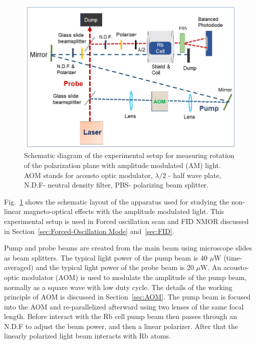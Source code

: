 \begin{figure}%
\centering
\includegraphics[width=0.95\linewidth]{figures/experimental_setup}
\caption{Schematic diagram of the experimental setup for measuring
  rotation of the polarization plane with amplitude modulated (AM)
  light. AOM stands for acousto optic modulator, $\lambda/2$ - half
  wave plate, N.D.F- neutral density filter, PBS- polarizing beam
  splitter.\label{fig:pumpprobe}}
\end{figure}

Fig.~\ref{fig:pumpprobe} shows the schematic layout of the apparatus
used for studying the non-linear magneto-optical effects with the
amplitude modulated light. This experimental setup is used in Forced
oscillation scan and FID NMOR discussed in
Section~\ref{sec:Forced-Oscillation Mode} and~\ref{sec:FID}.



Pump and probe beams are created from the main beam using microscope
slides as beam splitters. The typical light power of the pump beam is
40 $\mu$W (time-averaged) and the typical light power of the probe
beam is 20 $\mu$W.  An acousto-optic modulator (AOM) is used to
modulate the amplitude of the pump beam, normally as a square wave
with low duty cycle.  The details of the working principle of AOM is
discussed in Section~\ref{sec:AOM}.  The pump beam is focused into the
AOM and re-parallelized afterward using two lenses of the same focal
length.  Before interact with the Rb cell pump beam then passes
through an N.D.F to adjust the beam power, and then a linear
polarizer.  After that the linearly polarized light beam interacts with
Rb atoms.

